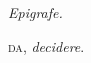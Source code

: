 \thispagestyle{empty}
\cleardoublepage
\thispagestyle{empty}
\vspace*{3cm}
\def\epigraphwidth{200pt}
\epigraph{
\textit{Epigrafe.}
}{\textsc{da}, \textit{decidere}.}
